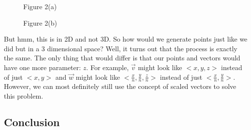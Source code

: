 \documentclass[14pt]{article}
\begin{document}
\begin{figure}[H]
\begin{center}
\begin{minipage}[b]{0.48\textwidth}
\begin{center}
			\end{center}
		\end{minipage}
	\end{center}
	\begin{center}
		\begin{minipage}[t]{0.48\textwidth}
			\caption*{Figure 2(a)}
		\end{minipage}
		\hfill
		\begin{minipage}[t]{0.48\textwidth}
			\caption*{Figure 2(b)}
		\end{minipage}
	\end{center}
\end{figure}

\vspace{-7mm}

But hmm, this is in 2D and not 3D. So how would we generate points just like we did but in a 3 dimensional space? Well, it turns out that the process is exactly the same. The only thing that would differ is that our points and vectors would have one more parameter: $z$. For example, $\overrightarrow{v}$ might look like $<x, y, z>$ instead of just $<x, y>$ and $\overrightarrow{w}$ might look like $<\frac{x}{n}, \frac{y}{n}, \frac{z}{n}>$ instead of just $<\frac{x}{n}, \frac{y}{n}>$. However, we can most definitely still use the concept of scaled vectors to solve this problem.

\vspace{-2mm}

\subsection*{Conclusion}
\end{document}
